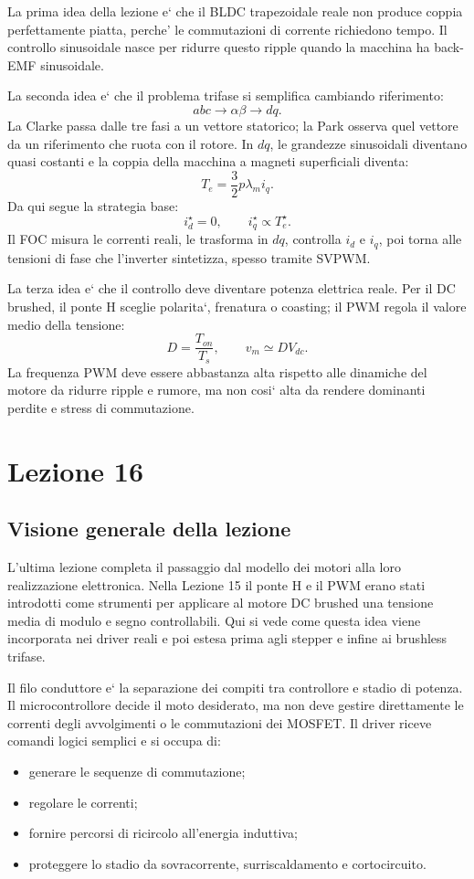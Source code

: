 \documentclass[11pt,a4paper]{article}
\begin{document}
La prima idea della lezione e` che il BLDC trapezoidale reale non produce coppia perfettamente piatta, perche' le commutazioni di corrente richiedono tempo. Il controllo sinusoidale nasce per ridurre questo ripple quando la macchina ha back-EMF sinusoidale.

La seconda idea e` che il problema trifase si semplifica cambiando riferimento:
\[
abc \longrightarrow \alpha\beta \longrightarrow dq.
\]
La Clarke passa dalle tre fasi a un vettore statorico; la Park osserva quel vettore da un riferimento che ruota con il rotore. In \(dq\), le grandezze sinusoidali diventano quasi costanti e la coppia della macchina a magneti superficiali diventa:
\[
T_e=\frac{3}{2}p\lambda_m i_q.
\]
Da qui segue la strategia base:
\[
i_d^\star=0,
\qquad
i_q^\star\propto T_e^\star.
\]
Il FOC misura le correnti reali, le trasforma in \(dq\), controlla \(i_d\) e \(i_q\), poi torna alle tensioni di fase che l'inverter sintetizza, spesso tramite SVPWM.

La terza idea e` che il controllo deve diventare potenza elettrica reale. Per il DC brushed, il ponte H sceglie polarita`, frenatura o coasting; il PWM regola il valore medio della tensione:
\[
D=\frac{T_{on}}{T_s},
\qquad
v_m\simeq D V_{dc}.
\]
La frequenza PWM deve essere abbastanza alta rispetto alle dinamiche del motore da ridurre ripple e rumore, ma non cosi` alta da rendere dominanti perdite e stress di commutazione.


\clearpage
\section{Lezione 16}

\subsection{Visione generale della lezione}

L'ultima lezione completa il passaggio dal modello dei motori alla loro realizzazione elettronica. Nella Lezione 15 il ponte H e il PWM erano stati introdotti come strumenti per applicare al motore DC brushed una tensione media di modulo e segno controllabili. Qui si vede come questa idea viene incorporata nei driver reali e poi estesa prima agli stepper e infine ai brushless trifase.

Il filo conduttore e` la separazione dei compiti tra controllore e stadio di potenza. Il microcontrollore decide il moto desiderato, ma non deve gestire direttamente le correnti degli avvolgimenti o le commutazioni dei MOSFET. Il driver riceve comandi logici semplici e si occupa di:
\begin{itemize}
\item generare le sequenze di commutazione;
\item regolare le correnti;
\item fornire percorsi di ricircolo all'energia induttiva;
\item proteggere lo stadio da sovracorrente, surriscaldamento e cortocircuito.
\end{itemize}
\end{document}
